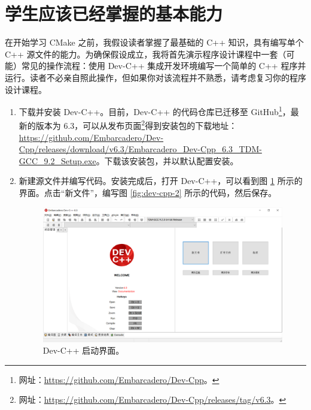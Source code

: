 
\section{学生应该已经掌握的基本能力}

在开始学习 CMake 之前，我假设读者掌握了最基础的 C++ 知识，具有编写单个 C++ 源文件的能力。为确保假设成立，我将首先演示程序设计课程中一套（可能）常见的操作流程：使用 Dev-C++ 集成开发环境编写一个简单的 C++ 程序并运行。读者不必亲自照此操作，但如果你对该流程并不熟悉，请考虑复习你的程序设计课程。

\begin{enumerate}
	\item 下载并安装 Dev-C++。目前，Dev-C++ 的代码仓库已迁移至 GitHub\footnote{网址：\url{https://github.com/Embarcadero/Dev-Cpp}。}，最新的版本为 6.3，可以从发布页面\footnote{网址：\url{https://github.com/Embarcadero/Dev-Cpp/releases/tag/v6.3}。}得到安装包的下载地址：\url{https://github.com/Embarcadero/Dev-Cpp/releases/download/v6.3/Embarcadero_Dev-Cpp_6.3_TDM-GCC_9.2_Setup.exe}。下载该安装包，并以默认配置安装。

	\item 新建源文件并编写代码。安装完成后，打开 Dev-C++，可以看到图 \ref{fig:dev-cpp-1} 所示的界面。点击“新文件”，编写图 \ref{fig:dev-cpp-2} 所示的代码，然后保存。

	\begin{figure}[p]
		\centering
		\includegraphics[width=\linewidth]{assets/dev-cpp-1}
		\caption{Dev-C++ 启动界面。}
		\label{fig:dev-cpp-1}
	\end{figure}


\end{enumerate}
